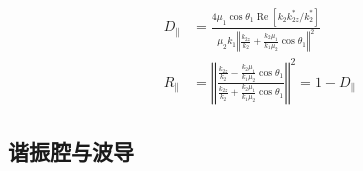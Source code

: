 \documentclass[12pt,a4paper]{article}%
\numberwithin{equation}{section}%
\renewcommand*{\Re}{\operatorname{Re}}
\begin{document}
\begin{enumerate}
\begin{itemize}
\begin{itemize}
\begin{align}
                D_\parallel &= \frac{4\mu_1\cos\theta_1\Re[k_2k_{2z}^*/k_2^*]}{\mu_2k_1\left\Vert\frac{k_{2z}}{k_2} + \frac{k_2\mu_1}{k_1\mu_2}\cos\theta_1\right\Vert^2} \\
                R_\parallel &= \left\Vert\frac{\frac{k_{2z}}{k_2} - \frac{k_2\mu_1}{k_1\mu_2}\cos\theta_1}{\frac{k_{2z}}{k_2} + \frac{k_2\mu_1}{k_1\mu_2}\cos\theta_1}\right\Vert^2 = 1-D_\parallel
            \end{align}
        \end{itemize}
    \end{itemize}
\end{enumerate}
\subsection{谐振腔与波导} %
\label{sub:resonant_cavity_and_wave_guide}
\end{document}
